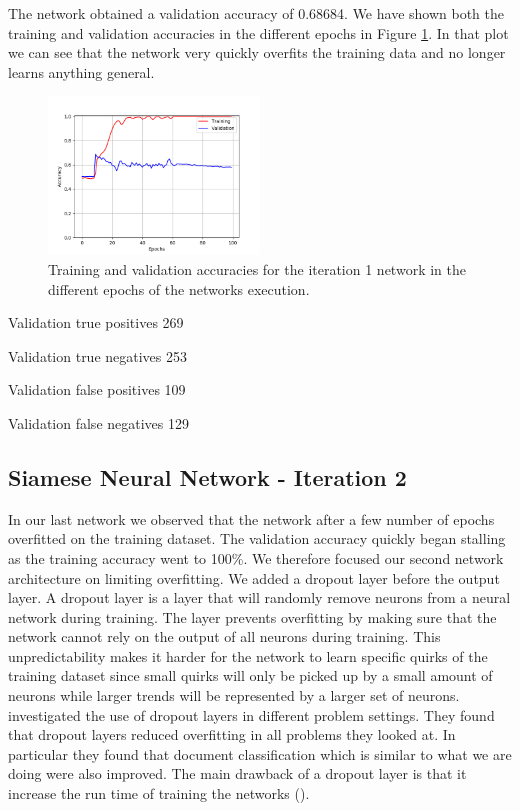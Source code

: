 The network obtained a validation accuracy of 0.68684. We have shown both the
training and validation accuracies in the different epochs in Figure
\ref{fig:network1_accuracies}. In that plot we can see that the network very
quickly overfits the training data and no longer learns anything general.

\begin{figure}[htb]
    \centering
    \includegraphics[width=0.5\textwidth]{./pictures/method/network_1_accuracies.png}
    \caption{Training and validation accuracies for the iteration 1 network in
        the different epochs of the networks execution.}
    \label{fig:network1_accuracies}
\end{figure}

Validation true positives 269

Validation true negatives 253

Validation false positives 109

Validation false negatives 129


\subsection{Siamese Neural Network - Iteration 2}


In our last network we observed that the network after a few number of epochs
overfitted on the training dataset. The validation accuracy quickly began
stalling as the training accuracy went to 100\%. We therefore focused our
second network architecture on limiting overfitting. We added a dropout layer
before the output layer. A dropout layer is a layer that will randomly remove
neurons from a neural network during training. The layer prevents overfitting
by making sure that the network cannot rely on the output of all neurons during
training. This unpredictability makes it harder for the network to learn
specific quirks of the training dataset since small quirks will only be picked
up by a small amount of neurons while larger trends will be represented by a
larger set of neurons. \cite{JMLR:v15:srivastava14a} investigated the use of
dropout layers in different problem settings. They found that dropout layers
reduced overfitting in all problems they looked at. In particular they found
that document classification which is similar to what we are doing were also
improved. The main drawback of a dropout layer is that it increase the run time
of training the networks (\cite{JMLR:v15:srivastava14a}).

